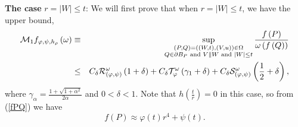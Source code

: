\documentclass{amsart}
\theoremstyle{plain}
\numberwithin{equation}{section}
\begin{document}
\textbf{The case }$r=\left\vert W\right\vert \leq t$: We will first prove
that when $r=\left\vert W\right\vert \leq t$, we have the upper bound, 
\begin{eqnarray}
\mathcal{M}_{1}f_{\varphi ,\psi ,h_{\rho }}\left( \omega \right) &\equiv
&\sup_{\substack{ \left( P,Q\right) =\left( \left( W,t\right) ,\left(
V,u\right) \right) \in \Omega  \\ Q\in \partial B_{P}\text{ and }V\parallel W%
\text{ and }\left\vert W\right\vert \leq t}}\frac{f\left( P\right) }{\omega
\left( f\left( Q\right) \right) }  \label{upper bound} \\
&\leq &C_{\delta }\mathcal{R}_{\left( \varphi ,\psi \right) }^{\omega
}\left( 1+\delta \right) +C_{\delta }\mathcal{T}_{\varphi }^{\omega }\left(
\gamma _{1}+\delta \right) +C_{\delta }\mathcal{S}_{\left( \varphi ,\psi
\right) }^{\omega }\left( \frac{1}{2}+\delta \right) ,  \notag
\end{eqnarray}%
where $\gamma _{\alpha }=\frac{1+\sqrt{1+\alpha ^{2}}}{2\alpha }$ and $%
0<\delta <1$. Note that $h(\frac{t}{r})=0$ in this case, so from (\ref{fPQ})
we have 
\begin{equation*}
f(P)\approx \varphi \left( t\right) r^{4}+\psi \left( t\right) .
\end{equation*}
\end{document}
